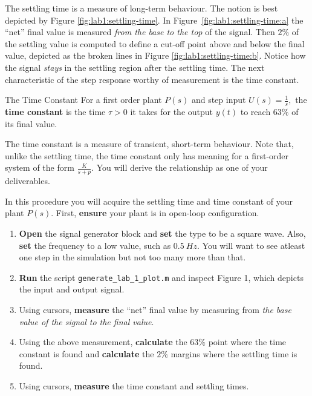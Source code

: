 %
The settling time is a measure of long-term behaviour.
The notion is best depicted by Figure
\ref{fig:lab1:settling-time}.
In Figure~\ref{fig:lab1:settling-time:a} the ``net'' final value is
measured \emph{from the base to the top} of the signal. Then \(2\%\) of the
settling value is computed to define a cut-off point above and below the final
value, depicted as the broken lines in Figure
\ref{fig:lab1:settling-time:b}. Notice how the signal \emph{stays} in the
settling region after the settling time.
The next characteristic of the step response worthy of measurement is the
time constant.
%
\begin{definition}[]{The Time Constant}
  For a first order plant \(P(s)\) and step input \(U(s) = \frac{1}{s},\)
  the \textbf{time constant} is the time \(\tau > 0\) it takes for
  the output \(y(t)\) to reach \(63\%\) of its final value.
\end{definition}
%
The time constant is a measure of transient, short-term behaviour. Note that,
unlike the settling time, the time constant only has meaning for a
first-order system of the form \(\frac{K}{s + p}.\) You will derive the
relationship as one of your deliverables.
%
\begin{procedure}[label={proc:lab1:p4}]
  In this procedure you will acquire the settling time and time constant
  of your plant \(P(s).\) First, \textbf{ensure} your plant is in open-loop
  configuration.
  \begin{enumerate}[label=(\arabic*)]
    \item{
      \textbf{Open} the signal generator block and \textbf{set} the type
      to be a square wave. Also, \textbf{set} the frequency to a low value,
      such as \(\SI{0.5}{Hz}.\) You will want to see atleast one step in
      the simulation but not too many more than that.
    }
    \item{
      \textbf{Run} the script \texttt{generate\_lab\_1\_plot.m} and inspect
      Figure 1, which depicts the input and output signal.
    }
    \item{
      Using cursors, \textbf{measure} the ``net'' final value by measuring from
      \emph{the base value of the signal to the final value}.
    }
    \item{
      Using the above measurement, \textbf{calculate} the \(63\%\) point
      where the time constant is found and \textbf{calculate} the \(2\%\)
      margins where the settling time is found.
    }
    \item{
      Using cursors, \textbf{measure} the time constant and settling times.
    }
  \end{enumerate}
\end{procedure}
